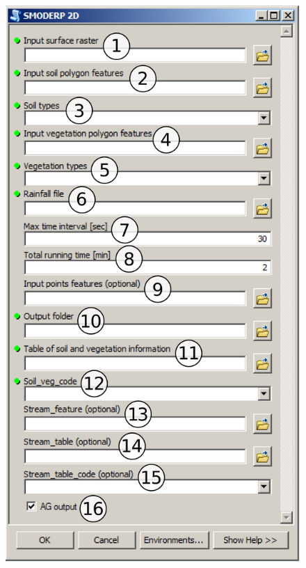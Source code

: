   \begin{figure}[t!]
    \centering
    \begin{minipage}[t]{.45\textwidth}
      \centering
      \vspace{0pt}
      \includegraphics[width=\textwidth]{./img/toolboxpopis2.png}
    \end{minipage}\hfill
    \begin{minipage}[t]{.55\textwidth}

\end{minipage}
\end{figure}

